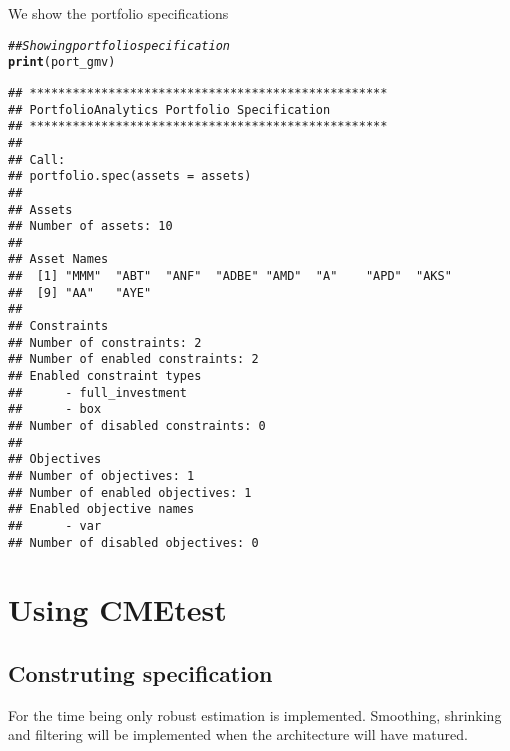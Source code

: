 \documentclass[12pt,letterpaper,english]{article}\usepackage[]{graphicx}\usepackage[]{color}
\makeatletter
\newcommand{\hlcom}[1]{\textcolor[rgb]{0.678,0.584,0.686}{\textit{#1}}}%
\newcommand{\hlstd}[1]{\textcolor[rgb]{0.345,0.345,0.345}{#1}}%
\newcommand{\hlkwd}[1]{\textcolor[rgb]{0.737,0.353,0.396}{\textbf{#1}}}%
\newenvironment{kframe}{%
 \def\at@end@of@kframe{}%
 \ifinner\ifhmode%
  \def\at@end@of@kframe{\end{minipage}}%
  \begin{minipage}{\columnwidth}%
 \fi\fi%
 \def\FrameCommand##1{\hskip\@totalleftmargin \hskip-\fboxsep
 \colorbox{shadecolor}{##1}\hskip-\fboxsep
     \hskip-\linewidth \hskip-\@totalleftmargin \hskip\columnwidth}%
 \MakeFramed {\advance\hsize-\width
   \@totalleftmargin\z@ \linewidth\hsize
   \@setminipage}}%
 {\par\unskip\endMakeFramed%
 \at@end@of@kframe}
\newenvironment{knitrout}{}{} %
\makeatother
\begin{document}
We show the portfolio specifications
\begin{knitrout}
\color{fgcolor}\begin{kframe}
\begin{alltt}
\hlcom{## Showing portfolio specification}
\hlkwd{print}\hlstd{(port_gmv)}
\end{alltt}
\begin{verbatim}
## **************************************************
## PortfolioAnalytics Portfolio Specification 
## **************************************************
## 
## Call:
## portfolio.spec(assets = assets)
## 
## Assets
## Number of assets: 10 
## 
## Asset Names
##  [1] "MMM"  "ABT"  "ANF"  "ADBE" "AMD"  "A"    "APD"  "AKS" 
##  [9] "AA"   "AYE" 
## 
## Constraints
## Number of constraints: 2 
## Number of enabled constraints: 2 
## Enabled constraint types
## 		- full_investment 
## 		- box 
## Number of disabled constraints: 0 
## 
## Objectives
## Number of objectives: 1 
## Number of enabled objectives: 1 
## Enabled objective names
## 		- var 
## Number of disabled objectives: 0
\end{verbatim}
\end{kframe}
\end{knitrout}


\section{Using CMEtest}
\subsection{Construting specification}
For the time being only robust estimation is implemented. Smoothing, shrinking and filtering will be implemented when the architecture will have matured.
\end{document}
